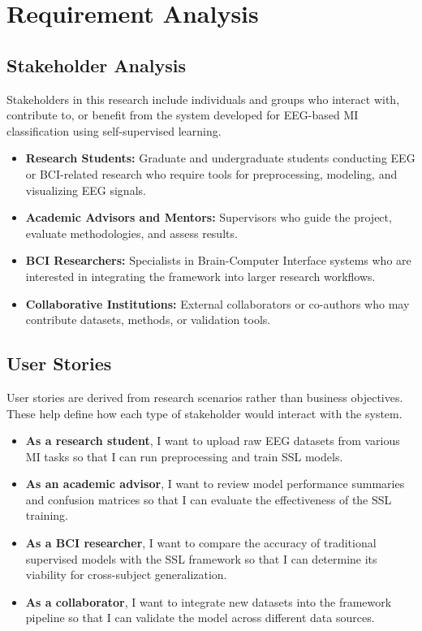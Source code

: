 \chapter{Requirement Analysis}
\label{ch:requirement-analysis}

\section{Stakeholder Analysis}
\label{sec:stakeholder-analysis}

Stakeholders in this research include individuals and groups who interact with, contribute to, or benefit from the system developed for EEG-based MI classification using self-supervised learning.

\begin{itemize}
    \item \textbf{Research Students:} Graduate and undergraduate students conducting EEG or BCI-related research who require tools for preprocessing, modeling, and visualizing EEG signals.
    \item \textbf{Academic Advisors and Mentors:} Supervisors who guide the project, evaluate methodologies, and assess results.
    \item \textbf{BCI Researchers:} Specialists in Brain-Computer Interface systems who are interested in integrating the framework into larger research workflows.
    \item \textbf{Collaborative Institutions:} External collaborators or co-authors who may contribute datasets, methods, or validation tools.
\end{itemize}


\section{User Stories}
\label{sec:user-stories}

User stories are derived from research scenarios rather than business objectives.
These help define how each type of stakeholder would interact with the system.

\begin{itemize}
    \item \textbf{As a research student}, I want to upload raw EEG datasets from various MI tasks so that I can run preprocessing and train SSL models.
    \item \textbf{As an academic advisor}, I want to review model performance summaries and confusion matrices so that I can evaluate the effectiveness of the SSL training.
    \item \textbf{As a BCI researcher}, I want to compare the accuracy of traditional supervised models with the SSL framework so that I can determine its viability for cross-subject generalization.
    \item \textbf{As a collaborator}, I want to integrate new datasets into the framework pipeline so that I can validate the model across different data sources.
\end{itemize}


